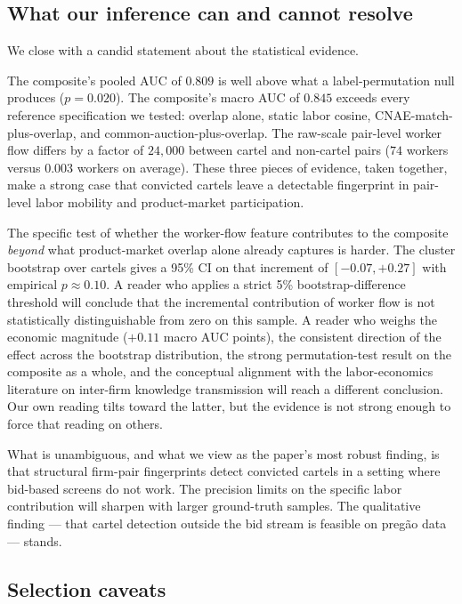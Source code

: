\subsection*{What our inference can and cannot resolve}

We close with a candid statement about the statistical evidence.

The composite's pooled AUC of $0.809$ is well above what a label-permutation null produces ($p = 0.020$). The composite's macro AUC of $0.845$ exceeds every reference specification we tested: overlap alone, static labor cosine, CNAE-match-plus-overlap, and common-auction-plus-overlap. The raw-scale pair-level worker flow differs by a factor of $24{,}000$ between cartel and non-cartel pairs ($74$ workers versus $0.003$ workers on average). These three pieces of evidence, taken together, make a strong case that convicted cartels leave a detectable fingerprint in pair-level labor mobility and product-market participation.

The specific test of whether the worker-flow feature contributes to the composite \emph{beyond} what product-market overlap alone already captures is harder. The cluster bootstrap over cartels gives a 95\% CI on that increment of $[-0.07, +0.27]$ with empirical $p \approx 0.10$. A reader who applies a strict 5\% bootstrap-difference threshold will conclude that the incremental contribution of worker flow is not statistically distinguishable from zero on this sample. A reader who weighs the economic magnitude ($+0.11$ macro AUC points), the consistent direction of the effect across the bootstrap distribution, the strong permutation-test result on the composite as a whole, and the conceptual alignment with the labor-economics literature on inter-firm knowledge transmission will reach a different conclusion. Our own reading tilts toward the latter, but the evidence is not strong enough to force that reading on others.

What is unambiguous, and what we view as the paper's most robust finding, is that structural firm-pair fingerprints detect convicted cartels in a setting where bid-based screens do not work. The precision limits on the specific labor contribution will sharpen with larger ground-truth samples. The qualitative finding --- that cartel detection outside the bid stream is feasible on preg\~{a}o data --- stands.

\subsection*{Selection caveats}

